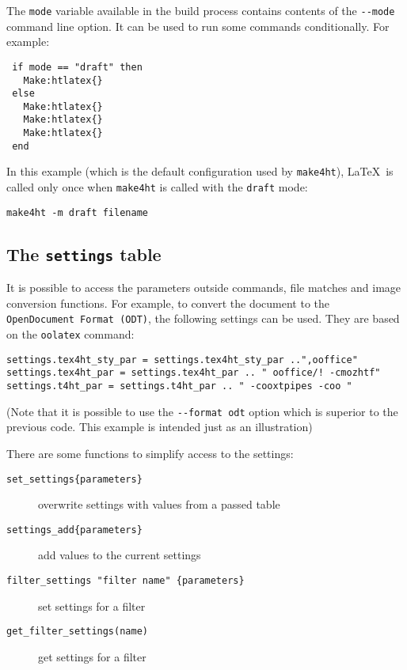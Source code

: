 The \texttt{mode} variable available in the build process contains
contents of the \texttt{-\/-mode} command line option. It can be used to
run some commands conditionally. For example:

\begin{verbatim}
 if mode == "draft" then
   Make:htlatex{} 
 else
   Make:htlatex{}
   Make:htlatex{}
   Make:htlatex{}
 end
\end{verbatim}

In this example (which is the default configuration used by
\texttt{make4ht}), \LaTeX~is called only once when \texttt{make4ht} is
called with the \texttt{draft} mode:

\begin{verbatim}
make4ht -m draft filename
\end{verbatim}

\hypertarget{the-settings-table}{%
\subsection{\texorpdfstring{The \texttt{settings}
table}{The settings table}}\label{the-settings-table}}

\label{sec:settings}

It is possible to access the parameters outside commands, file matches
and image conversion functions. For example, to convert the document to
the \texttt{OpenDocument\ Format\ (ODT)}, the following settings can be
used. They are based on the \texttt{oolatex} command:

\begin{verbatim}
settings.tex4ht_sty_par = settings.tex4ht_sty_par ..",ooffice"
settings.tex4ht_par = settings.tex4ht_par .. " ooffice/! -cmozhtf"
settings.t4ht_par = settings.t4ht_par .. " -cooxtpipes -coo "
\end{verbatim}

(Note that it is possible to use the \texttt{-\/-format\ odt} option
which is superior to the previous code. This example is intended just as
an illustration)

There are some functions to simplify access to the settings:

\begin{description}
\item[\texttt{set\_settings\{parameters\}}]
overwrite settings with values from a passed table
\item[\texttt{settings\_add\{parameters\}}]
add values to the current settings
\item[\texttt{filter\_settings\ "filter\ name"\ \{parameters\}}]
set settings for a filter
\item[\texttt{get\_filter\_settings(name)}]
get settings for a filter
\end{description}


